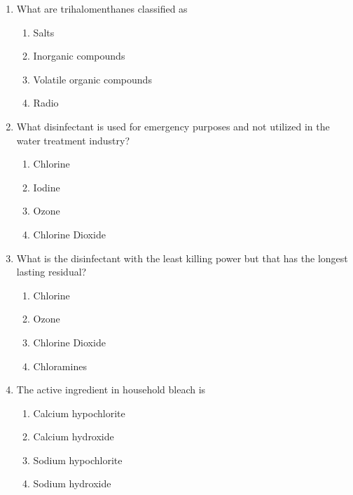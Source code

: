 \begin{enumerate}
\item  What are trihalomenthanes classified as\\
\begin{enumerate}
\item Salts\\
\item Inorganic compounds\\
\item Volatile organic compounds\\
\item Radio
\end{enumerate}

\item  What disinfectant is used for emergency purposes and not utilized in the water treatment industry?\\
\begin{enumerate}
\item Chlorine\\
\item Iodine\\
\item Ozone\\
\item Chlorine Dioxide
\end{enumerate}

\item  What is the disinfectant with the least killing power but that has the longest lasting residual?\\
\begin{enumerate}
\item Chlorine\\
\item Ozone\\
\item Chlorine Dioxide\\
\item Chloramines
\end{enumerate}

\item  The active ingredient in household bleach is\\
\begin{enumerate}
\item Calcium hypochlorite\\
\item Calcium hydroxide\\
\item Sodium hypochlorite\\
\item Sodium hydroxide
\end{enumerate}


\end{enumerate}
